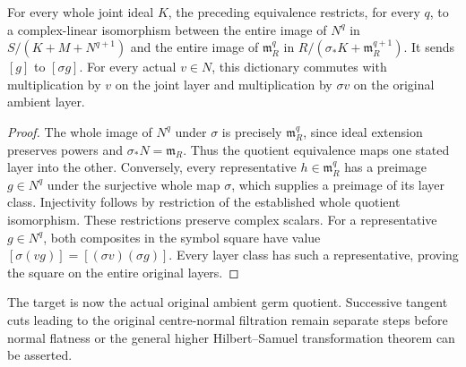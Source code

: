 \begin{theorem}
\label{hir:actual-joint-base-fibre-layer-symbols}
\leanok
{}
For every whole joint ideal $K$, the preceding equivalence restricts,
for every $q$, to a complex-linear
isomorphism between the entire image of $N^q$ in
$S/(K+M+N^{q+1})$ and the entire image of $\mathfrak m_R^q$ in
$R/(\sigma_*K+\mathfrak m_R^{q+1})$. It sends $[g]$ to $[\sigma g]$.
For every actual $v\in N$, this dictionary commutes with multiplication
by $v$ on the joint layer and multiplication by $\sigma v$ on the
original ambient layer.
\end{theorem}
\begin{proof}
The whole image of $N^q$ under $\sigma$ is precisely
$\mathfrak m_R^q$, since ideal extension preserves powers and
$\sigma_*N=\mathfrak m_R$. Thus the quotient equivalence maps
one stated layer into the other. Conversely, every representative
$h\in\mathfrak m_R^q$ has a preimage $g\in N^q$ under the
surjective whole map $\sigma$, which supplies a preimage of its
layer class. Injectivity follows by restriction of the established
whole quotient isomorphism. These restrictions preserve complex
scalars. For a representative $g\in N^q$, both composites in
the symbol square have value $[\sigma(vg)]=[(\sigma v)(\sigma g)]$.
Every layer class has such a representative, proving the square
on the entire original layers.
\end{proof}

The target is now the actual original ambient germ quotient. Successive tangent
cuts leading to the original centre-normal filtration remain separate
steps before normal flatness or the general higher Hilbert--Samuel
transformation theorem can be asserted.

